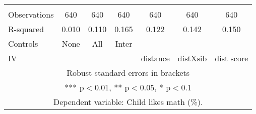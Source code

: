 \begin{tabular}{lcccccc}
 &  &  &  &  &  &  \\
Observations & 640 & 640 & 640 & 640 & 640 & 640 \\
R-squared & 0.010 & 0.110 & 0.165 & 0.122 & 0.142 & 0.150 \\
Controls & None & All & Inter &  &  &  \\
 IV &  &  &  & distance & distXsib & dist score \\ \hline
\multicolumn{7}{c}{ Robust standard errors in brackets} \\
\multicolumn{7}{c}{ *** p$<$0.01, ** p$<$0.05, * p$<$0.1} \\
\multicolumn{7}{c}{ Dependent variable: Child likes math (\%).} \\
\end{tabular}
